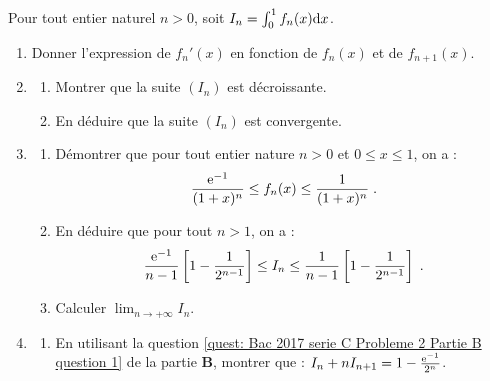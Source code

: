 \begin{description}
\begin{enumerate}
                  \end{enumerate}
            \item[Partie B]
                  Pour tout entier naturel $n > 0$, soit $I_n = \int_{0}^{1} f_n (x) \mathrm{d}x$.
                  \begin{enumerate}
                        \item Donner l'expression de $f_n'(x)$ en fonction de $f_n(x)$ et de $f_{n+1}(x)$.
                              \label{quest: Bac 2017 serie C Probleme 2 Partie B question 1}
                        \item \begin{enumerate}
                                    \item Montrer que la suite $(I_n)$ est d\'ecroissante.
                                    \item En d\'eduire que la suite $(I_n)$ est convergente.
                              \end{enumerate}
                        \item \begin{enumerate}
                                    \item D\'emontrer que pour tout entier nature $n>0$ et $0\leq x \leq 1$, on a : 
                                          \[
                                                \frac{\mathrm{e}^{-1}}{(1+x)^n} \leq f_n(x) \leq \frac{1}{(1+x)^n} \;.
                                          \]
                                    \item En d\'eduire que pour tout $n>1$, on a : 
                                          \[
                                                \frac{\mathrm{e}^{-1}}{n-1} \left[ 1-\frac{1}{2^{n-1}} \right]
                                                \leq I_n \leq 
                                                \frac{1}{n-1} \left[ 1-\frac{1}{2^{n-1}} \right] \;.
                                          \]
                                    \item Calculer $\displaystyle{\lim_{n\rightarrow +\infty} I_n}$.
                              \end{enumerate}
                        \item \begin{enumerate}
                                    \item En utilisant la question \ref{quest: Bac 2017 serie C Probleme 2 Partie B question 1}
                                          de la partie \textbf{B},
                                          montrer que : $I_n + n I_{n+1} = 1 - \frac{\mathrm{e}^{-1}}{2^n}$.

\end{enumerate}
\end{enumerate}
\end{description}
